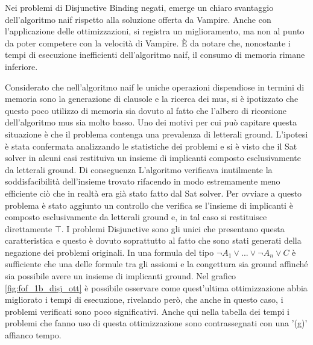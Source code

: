 \documentclass[./main.tex]{subfiles}
\begin{document}
Nei problemi di Disjunctive Binding negati, emerge un chiaro svantaggio dell'algoritmo naif rispetto alla soluzione offerta da Vampire. 
Anche con l'applicazione delle ottimizzazioni, si registra un miglioramento, 
ma non al punto da poter competere con la velocità di Vampire. È da notare che, 
nonostante i tempi di esecuzione inefficienti dell'algoritmo naif, 
il consumo di memoria rimane inferiore.


Considerato che nell'algoritmo naif le uniche operazioni dispendiose in termini di 
memoria sono la generazione di clausole e la ricerca dei mus, si 
è ipotizzato che questo poco utilizzo di memoria sia dovuto al fatto che
l'albero di ricorsione dell'algoritmo mus sia molto basso.
Uno dei motivi per cui può capitare questa situazione è che il problema contenga 
una prevalenza di letterali ground.
L'ipotesi è stata confermata analizzando le statistiche dei problemi e
si è visto che il Sat solver in alcuni casi restituiva un insieme di implicanti
composto esclusivamente da letterali ground.
Di conseguenza L'algoritmo verificava inutilmente la soddisfacibilità dell'insieme trovato
rifacendo in modo estremamente meno efficiente ciò che in realtà era già stato fatto dal Sat solver.
Per ovviare a questo problema è stato aggiunto un controllo che verifica se l'insieme di implicanti 
è composto esclusivamente da letterali ground e, in tal caso si restituisce direttamente $\top$.
I problemi Disjunctive sono gli unici che presentano questa caratteristica e questo è 
dovuto soprattutto al fatto che sono stati generati della negazione dei problemi originali.
In una formula del tipo $\lnot A_1 \lor ... \lor \lnot A_n \lor C$ è sufficiente che una delle 
formule tra gli assiomi e la congettura sia ground affinché 
sia possibile avere un insieme di implicanti ground.
Nel grafico \ref{fig:fof_1b_disj_ott} è possibile osservare come quest'ultima 
ottimizzazione abbia migliorato i tempi di esecuzione,
rivelando però, che anche in questo caso, i problemi verificati sono poco significativi.
Anche qui nella tabella dei tempi i problemi che fanno uso di questa ottimizzazione sono contrassegnati con una '(g)' affianco tempo.

\end{document}
